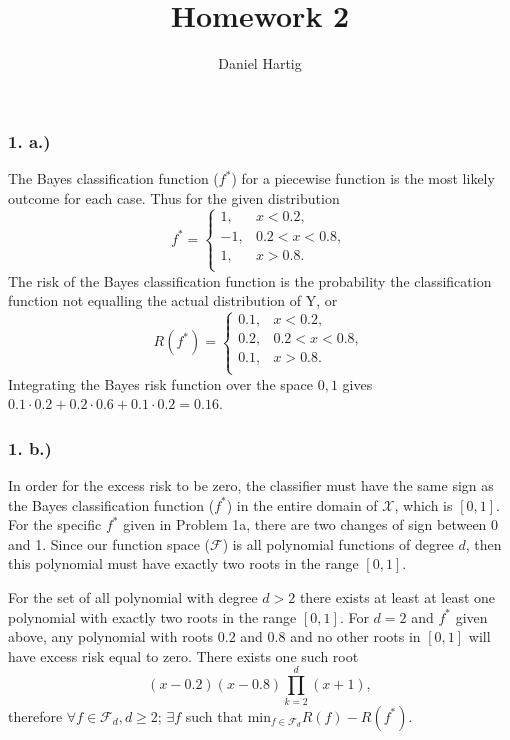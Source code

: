\documentclass{article}
\title{Homework 2}
\author{Daniel Hartig}
\begin{document}
\maketitle

\subsubsection*{1. a.)}

The Bayes classification function ($f^*$) for a piecewise function is the most likely outcome for each case. Thus for the given distribution
$$ f^* = \begin{cases} 
1,& x < 0.2, \\
-1,& 0.2 < x < 0.8,\\
1,& x > 0.8.\\ \end{cases} $$ The risk of the Bayes classification function is the probability the classification function not equalling the actual distribution of Y, or
$$ R(f^*) = \begin{cases} 
0.1,& x < 0.2, \\
0.2,& 0.2 < x < 0.8,\\
0.1,& x > 0.8.\\ \end{cases} $$
Integrating the Bayes risk function over the space ${0, 1}$ gives $0.1\cdot0.2 + 0.2\cdot0.6+0.1\cdot0.2 = 0.16$.

\subsubsection*{1. b.)}

In order for the excess risk to be zero, the classifier must have the same sign as the Bayes classification function ($f^*$) in the entire domain of $\mathcal{X}$, which is $[0, 1]$. For the specific $f^*$ given in Problem 1a, there are two changes of sign between 0 and 1. Since our function space ($\mathcal{F}$) is all polynomial functions of degree $d$, then this polynomial must have exactly two roots in the range $[0, 1]$.

For the set of all polynomial with degree $d >2$ there exists at least at least one polynomial with exactly two roots in the range $[0, 1]$. For $d=2$ and $f^*$ given above, any polynomial with roots $0.2$ and $0.8$ and no other roots in $[0, 1]$ will have excess risk equal to zero. There exists one such root $${\displaystyle (x-0.2)(x-0.8)\prod_{k = 2}^{d}(x+1)},$$ therefore $\forall f\in\mathcal{F}_d, d\geq2$; $\exists f$ such that ${\displaystyle \textrm{min}_{f\in\mathcal{F}_d} R(f) - R(f^*)}$.
\end{document}
